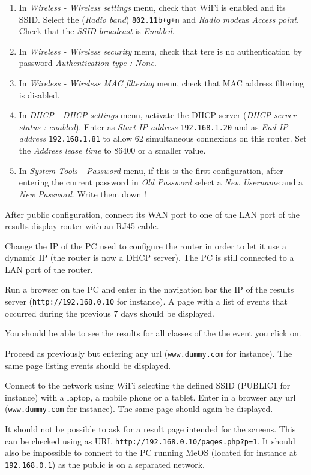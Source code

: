 \documentclass[a4paper]{ffco-rapport}
\begin{document}
\begin{enumerate}
		\item In \emph{Wireless - Wireless settings} menu, check that WiFi is enabled and its SSID. Select the (\emph{Radio band}) \texttt{802.11b+g+n} and \emph{Radio mode}as \emph{Access point}. Check that the \emph{SSID broadcast} is \emph{Enabled}.
		\item In \emph{Wireless - Wireless security} menu, check that tere is no authentication by password \emph{Authentication type : None}.
		\item In \emph{Wireless - Wireless MAC filtering} menu, check that MAC address filtering is disabled.
		\item In \emph{DHCP - DHCP settings} menu, activate the DHCP server (\emph{DHCP server status : enabled}).
					Enter as \emph{Start IP address} \texttt{192.168.1.20} and as \emph{End IP address} \texttt{192.168.1.81} to allow 62 simultaneous connexions on this router. Set the \emph{Address lease time} to 86400 or a smaller value.
		\item In \emph{System Tools - Password} menu, if this is the first configuration, after entering the current password in \emph{Old Password} select a \emph{New Username} and a \emph{New Password}. Write them down !
	\end{enumerate}
	
	After public configuration, connect its WAN port to one of the LAN port of the results display router with an RJ45 cable.

	Change the IP of the PC used to configure the router in order to let it use a dynamic IP (the router is now a DHCP server). The PC is still connected to a LAN port of the router.
	
	Run a browser on the PC and enter in the navigation bar the IP of the results server (\texttt{http://192.168.0.10} for instance). A page with a list of events that occurred during the previous 7 days should be displayed.
	
	You should be able to see the results for all classes of the the event you click on.

	Proceed as previously but entering any url (\texttt{www.dummy.com} for instance). The same page listing events should be displayed.
	
	Connect to the network using WiFi selecting the defined SSID (PUBLIC1 for instance) with a laptop, a mobile phone or a tablet. Enter in a browser any url (\texttt{www.dummy.com} for instance). The same page should again be displayed.
	
	It should not be possible to ask for a result page intended for the screens. This can be checked using as URL \texttt{http://192.168.0.10/pages.php?p=1}. It should also be impossible to connect to the PC running MeOS (located for instance at \texttt{192.168.0.1}) as the public is on a separated network.
		
\end{document}
